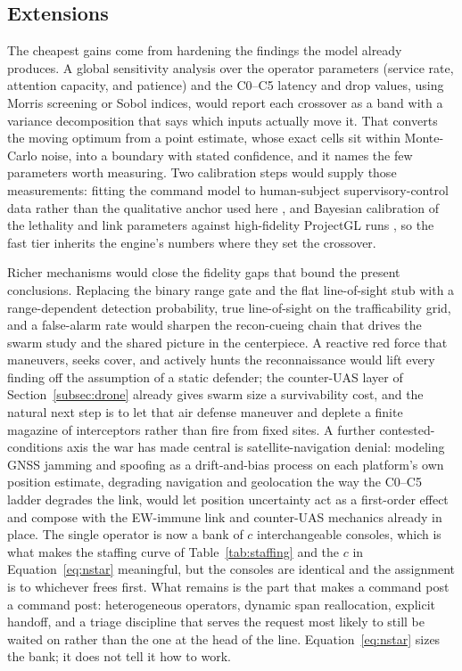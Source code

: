 \documentclass[11pt]{article}
\begin{document}
\subsection{Extensions}
\label{subsec:extensions}

The cheapest gains come from hardening the findings the model already produces. A global sensitivity analysis over the operator parameters (service rate, attention capacity, and patience) and the C0--C5 latency and drop values, using Morris screening or Sobol indices, would report each crossover as a band with a variance decomposition that says which inputs actually move it. That converts the moving optimum from a point estimate, whose exact cells sit within Monte-Carlo noise, into a boundary with stated confidence, and it names the few parameters worth measuring. Two calibration steps would supply those measurements: fitting the command model to human-subject supervisory-control data rather than the qualitative anchor used here \citep{cummings2007capacity,chen2011supervisory,hocraffer2017meta}, and Bayesian calibration of the lethality and link parameters against high-fidelity ProjectGL runs \citep{stanko2025projectgl}, so the fast tier inherits the engine's numbers where they set the crossover.

Richer mechanisms would close the fidelity gaps that bound the present conclusions. Replacing the binary range gate and the flat line-of-sight stub with a range-dependent detection probability, true line-of-sight on the trafficability grid, and a false-alarm rate would sharpen the recon-cueing chain that drives the swarm study and the shared picture in the centerpiece. A reactive red force that maneuvers, seeks cover, and actively hunts the reconnaissance would lift every finding off the assumption of a static defender; the counter-UAS layer of Section~\ref{subsec:drone} already gives swarm size a survivability cost, and the natural next step is to let that air defense maneuver and deplete a finite magazine of interceptors rather than fire from fixed sites. A further contested-conditions axis the war has made central is satellite-navigation denial: modeling GNSS jamming and spoofing as a drift-and-bias process on each platform's own position estimate, degrading navigation and geolocation the way the C0--C5 ladder degrades the link, would let position uncertainty act as a first-order effect and compose with the EW-immune link and counter-UAS mechanics already in place. The single operator is now a bank of $c$ interchangeable consoles, which is what makes the staffing curve of Table~\ref{tab:staffing} and the $c$ in Equation~\ref{eq:nstar} meaningful, but the consoles are identical and the assignment is to whichever frees first. What remains is the part that makes a command post a command post: heterogeneous operators, dynamic span reallocation, explicit handoff, and a triage discipline that serves the request most likely to still be waited on rather than the one at the head of the line. Equation~\ref{eq:nstar} sizes the bank; it does not tell it how to work.
\end{document}
